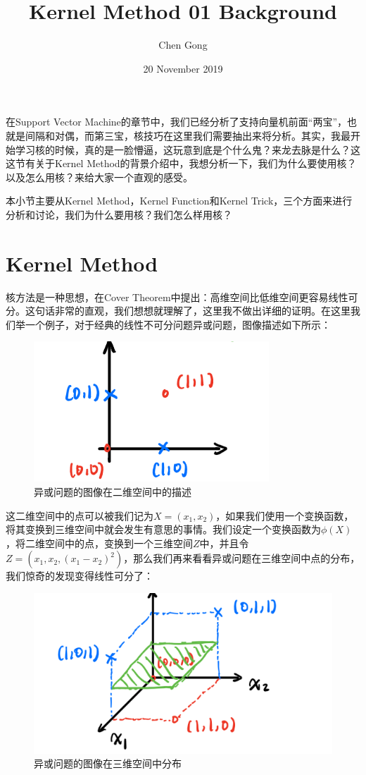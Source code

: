 \documentclass[a4paper]{article}
\title{Kernel Method 01 Background}
\author{Chen Gong}
\date{20 November 2019}
\begin{document}
\maketitle

在Support Vector Machine的章节中，我们已经分析了支持向量机前面“两宝”，也就是间隔和对偶，而第三宝，核技巧在这里我们需要抽出来将分析。其实，我最开始学习核的时候，真的是一脸懵逼，这玩意到底是个什么鬼？来龙去脉是什么？这这节有关于Kernel Method的背景介绍中，我想分析一下，我们为什么要使用核？以及怎么用核？来给大家一个直观的感受。

本小节主要从Kernel Method，Kernel Function和Kernel Trick，三个方面来进行分析和讨论，我们为什么要用核？我们怎么样用核？

\section{Kernel Method}
核方法是一种思想，在Cover Theorem中提出：高维空间比低维空间更容易线性可分。这句话非常的直观，我们想想就理解了，这里我不做出详细的证明。在这里我们举一个例子，对于经典的线性不可分问题异或问题，图像描述如下所示：
\begin{figure}[H]
    \centering
    \includegraphics[width=.5\textwidth]{微信图片_20191120100717.png}
    \caption{异或问题的图像在二维空间中的描述}
    \label{fig:my_label_1}
\end{figure}

这二维空间中的点可以被我们记为$X=(x_1,x_2)$，如果我们使用一个变换函数，将其变换到三维空间中就会发生有意思的事情。我们设定一个变换函数为$\phi(X)$，将二维空间中的点，变换到一个三维空间$Z$中，并且令$Z=(x_1,x_2,(x_1-x_2)^2)$，那么我们再来看看异或问题在三维空间中点的分布，我们惊奇的发现变得线性可分了：
\begin{figure}[H]
    \centering
    \includegraphics[width=.7\textwidth]{微信图片_20191120101440.png}
    \caption{异或问题的图像在三维空间中分布}
    \label{fig:my_label_2}
\end{figure}
\end{document}
